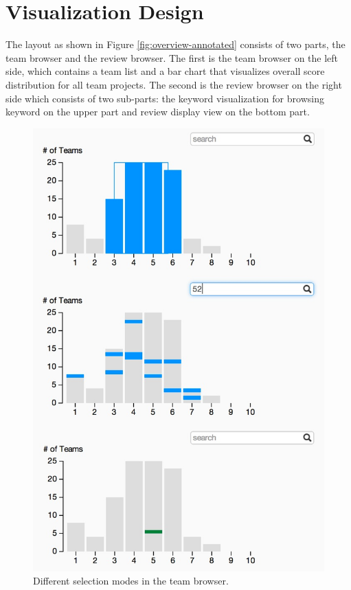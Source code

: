 \documentclass{sigchi}
\begin{document}
\section{Visualization Design}

The layout as shown in Figure \ref{fig:overview-annotated} consists of two
parts, the team browser and the review browser.  The first is the team browser
on the left side, which contains a team list and a bar chart that visualizes
overall score distribution for all team projects. The second is the review
browser on the right side which consists of two sub-parts: the keyword
visualization for browsing keyword on the upper part and review display view on
the bottom part.

\begin{figure}[tb]
\centering
\includegraphics[width=\columnwidth]{images/3charts}
\caption{Different selection modes in the team browser.}
\label{fig:keyword-lists}
\end{figure}
\end{document}
